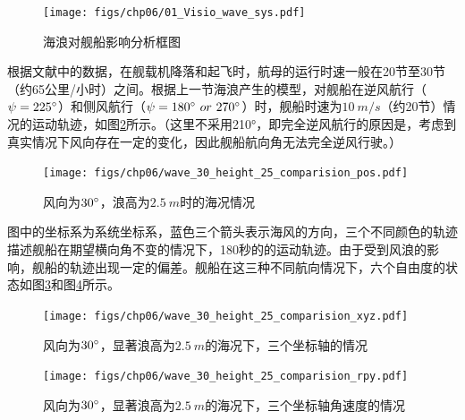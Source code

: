 \begin{figure}[!ht]
	\centering
	\texttt{[image: figs/chp06/01\_Visio\_wave\_sys.pdf]}	
	\caption{海浪对舰船影响分析框图}
	\label{fig:01_Visio_wave_sys}
\end{figure}
根据文献\cite{fitzgerald2004flight}中的数据，在舰载机降落和起飞时，航母的运行时速一般在20节至30节（约65公里/小时）之间。根据上一节海浪产生的模型，对舰船在逆风航行（$\psi=225\degree$）和侧风航行（$\psi = 180\degree\  or\  270\degree$）时，舰船时速为$10\ m/s$（约20节）情况的运动轨迹，如图\ref{fig:wave_30_height_25_comparision_pos}所示。（这里不采用210°，即完全逆风航行的原因是，考虑到真实情况下风向存在一定的变化，因此舰船航向角无法完全逆风行驶。）
\begin{figure}[!ht]
	\centering
	\texttt{[image: figs/chp06/wave\_30\_height\_25\_comparision\_pos.pdf]}	
	\caption{风向为$30\degree$，浪高为$2.5\ m$时的海况情况}
	\label{fig:wave_30_height_25_comparision_pos}
\end{figure}
图中的坐标系为系统坐标系，蓝色三个箭头表示海风的方向，三个不同颜色的轨迹描述舰船在期望横向角不变的情况下，180秒的的运动轨迹。由于受到风浪的影响，舰船的轨迹出现一定的偏差。舰船在这三种不同航向情况下，六个自由度的状态如图\ref{fig:wave_30_height_25_comparision_xyz}和图\ref{fig:wave_30_height_25_comparision_rpy}所示。

\begin{figure}[!ht]
	\centering
	\texttt{[image: figs/chp06/wave\_30\_height\_25\_comparision\_xyz.pdf]}	
	\caption{风向为$30\degree$，显著浪高为$2.5\ m$的海况下，三个坐标轴的情况}
	\label{fig:wave_30_height_25_comparision_xyz}
\end{figure}
\begin{figure}[!ht]
	\centering
	\texttt{[image: figs/chp06/wave\_30\_height\_25\_comparision\_rpy.pdf]}	
	\caption{风向为$30\degree$，显著浪高为$2.5\ m$的海况下，三个坐标轴角速度的情况}
	\label{fig:wave_30_height_25_comparision_rpy}
\end{figure}

